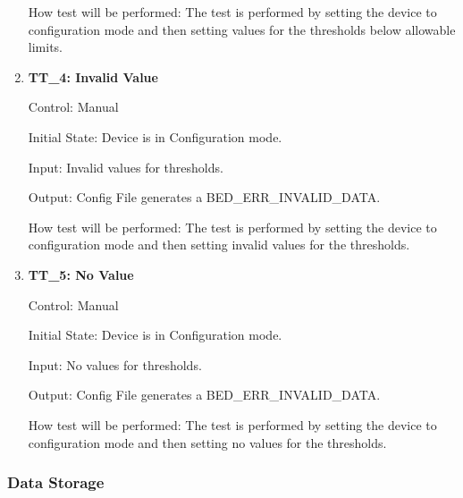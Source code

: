 \documentclass[12pt, titlepage]{article}
\begin{document}
\begin{enumerate}
		How test will be performed: The test is performed by setting the device to configuration mode and then setting values for the thresholds below allowable limits.

	\item{\textbf{TT\_4: Invalid Value} \\}\label{TT4}
	
		Control: Manual 
							
		Initial State: Device is in Configuration mode.
							
		Input: Invalid values for thresholds.
		
		Output: Config File generates a BED\_ERR\_INVALID\_DATA.
		
		How test will be performed: The test is performed by setting the device to configuration mode and then setting invalid values for the thresholds.

	\item{\textbf{TT\_5: No Value} \\}\label{TT5}
	
		Control: Manual 
							
		Initial State: Device is in Configuration mode.
							
		Input: No values for thresholds.
		
		Output: Config File generates a BED\_ERR\_INVALID\_DATA.

		How test will be performed: The test is performed by setting the device to configuration mode and then setting no values for the thresholds.
\end{enumerate}

\subsubsection{Data Storage}
\end{document}
